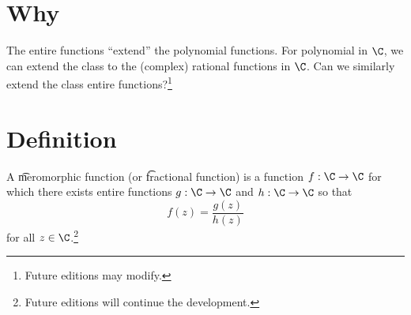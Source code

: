 
\section*{Why}

The entire functions ``extend'' the polynomial functions.
For polynomial in $\C $, we can extend the class to the (complex) rational functions in $\C $.
Can we similarly extend the class entire functions?\footnote{Future editions may modify.}

\section*{Definition}

A \t{meromorphic function} (or \t{fractional function}) is a function $f: \C  \to \C $ for which there exists entire functions $g: \C  \to \C $ and $h: \C  \to \C $ so that
\[
f(z) = \frac{g(z)}{h(z)}
\]
for all $z \in \C $.\footnote{Future editions will continue the development.}

\blankpage